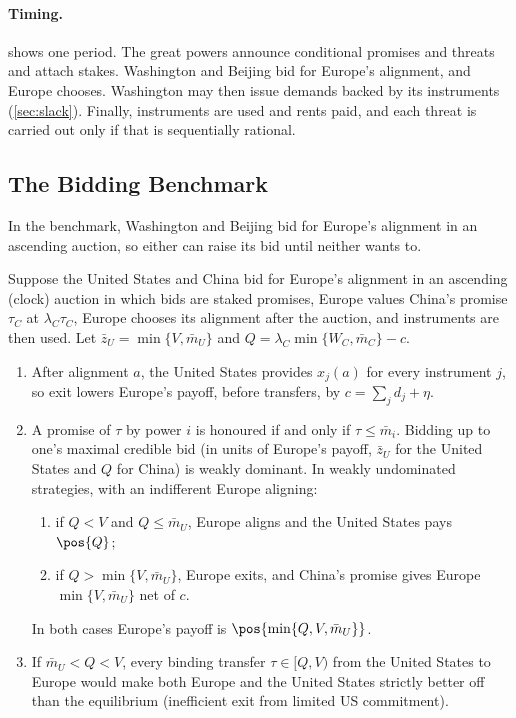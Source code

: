 \paragraph{Timing.}  shows one period. The great powers announce conditional promises and threats and attach stakes. Washington and Beijing bid for Europe's alignment, and Europe chooses. Washington may then issue demands backed by its instruments (\cref{sec:slack}). Finally, instruments are used and rents paid, and each threat is carried out only if that is sequentially rational.



\subsection{The Bidding Benchmark}\label{sec:bidding}

In the benchmark, Washington and Beijing bid for Europe's alignment in an ascending auction, so either can raise its bid until neither wants to.

\begin{lemma}\label{lem:bidding}
Suppose the United States and China bid for Europe's alignment in an ascending (clock) auction in which bids are staked promises, Europe values China's promise $\tau_C$ at $\lambda_C\tau_C$, Europe chooses its alignment after the auction, and instruments are then used. Let $\bar z_U=\min\{V,\bar m_U\}$ and $Q=\lambda_C\min\{W_C,\bar m_C\}-c$.
\begin{enumerate}[label=(\roman*)]
\item After alignment $a$, the United States provides $x_j(a)$ for every instrument $j$, so exit lowers Europe's payoff, before transfers, by $c=\sum_j d_j+\eta$.
\item A promise of $\tau$ by power $i$ is honoured if and only if $\tau\le\bar m_i$. Bidding up to one's maximal credible bid (in units of Europe's payoff, $\bar z_U$ for the United States and $Q$ for China) is weakly dominant. In weakly undominated strategies, with an indifferent Europe aligning:
 \begin{enumerate}[label=(\alph*)]
 \item if $Q<V$ and $Q\le\bar m_U$, Europe aligns and the United States pays $\pos{Q}$;
 \item if $Q>\min\{V,\bar m_U\}$, Europe exits, and China's promise gives Europe $\min\{V,\bar m_U\}$ net of $c$.
 \end{enumerate}
 In both cases Europe's payoff is $\pos{\min\{Q,V,\bar m_U\}}$.
\item If $\bar m_U<Q<V$, every binding transfer $\tau\in[Q,V)$ from the United States to Europe would make both Europe and the United States strictly better off than the equilibrium (inefficient exit from limited US commitment).
\end{enumerate}
\end{lemma}

